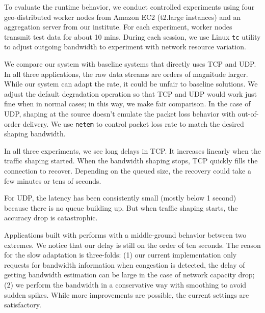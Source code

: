To evaluate the runtime behavior, we conduct controlled experiments using four
geo-distributed worker nodes from Amazon EC2 (t2.large instances) and an
aggregation server from our institute. For each experiment, worker nodes
transmit test data for about 10 mins. During each session, we use Linux
\texttt{tc} utility to adjust outgoing bandwidth to experiment with network
resource variation.

We compare our system with baseline systems that directly uses TCP and UDP. In
all three applications, the raw data streams are orders of magnitude
larger. While our system can adapt the rate, it could be unfair to baseline
solutions. We adjust the default degradation operation so that TCP and UDP would
work just fine when in normal cases; in this way, we make fair comparison. In
the case of UDP, shaping at the source doesn't emulate the packet loss behavior
with out-of-order delivery. We use \texttt{netem} to control packet loss rate to
match the desired shaping bandwidth.

In all three experiments, we see long delays in TCP. It increases linearly when
the traffic shaping started. When the bandwidth shaping stops, TCP quickly fills
the connection to recover. Depending on the queued size, the recovery could take
a few minutes or tens of seconds.

For UDP, the latency has been consistently small (mostly below 1 second) because
there is no queue building up. But when traffic shaping starts, the accuracy
drop is catastrophic.

Applications built with \sysname{} performs with a middle-ground behavior
between two extremes. We notice that our delay is still on the order of ten
seconds. The reason for the slow adaptation is three-folds: (1) our current
implementation only requests for bandwidth information when congestion is
detected, the delay of getting bandwidth estimation can be large in the case of
network capacity drop; (2) we perform the bandwidth in a conservative way with
smoothing to avoid sudden spikes. While more improvements are possible, the
current settings are satisfactory.

